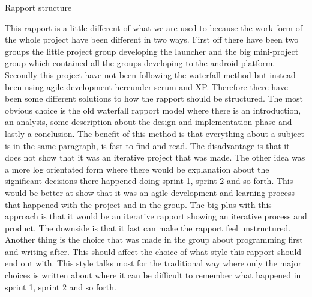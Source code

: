 Rapport structure

This rapport is a little different of what we are used to because the work form of the whole project have been different in two ways. First off there have been two groups the little project group developing the launcher and the big mini-project group which contained all the groups developing to the android platform. Secondly this project have not been following the waterfall method but instead been using agile development hereunder scrum and XP.
Therefore there have been some different solutions to how the rapport should be structured. The most obvious choice is the old waterfall rapport model where there is an introduction, an analysis, some description about the design and implementation phase and lastly a conclusion. The benefit of this method is that everything about a subject is in the same paragraph, is fast to find and read. The disadvantage is that it does not show that it was an iterative project that was made.
The other idea was a more log orientated form where there would be explanation about the significant decisions there happened doing sprint 1, sprint 2 and so forth. This would be better at show that it was an agile development and learning process that happened with the project and in the group. The big plus with this approach is that it would be an iterative rapport showing an iterative process and product. The downside is that it fast can make the rapport feel unstructured.
Another thing is the choice that was made in the group about programming first and writing after. This should affect the choice of what style this rapport should end out with. This style talks most for the traditional way where only the major choices is written about where it can be difficult to remember what happened in sprint 1, sprint 2 and so forth.
